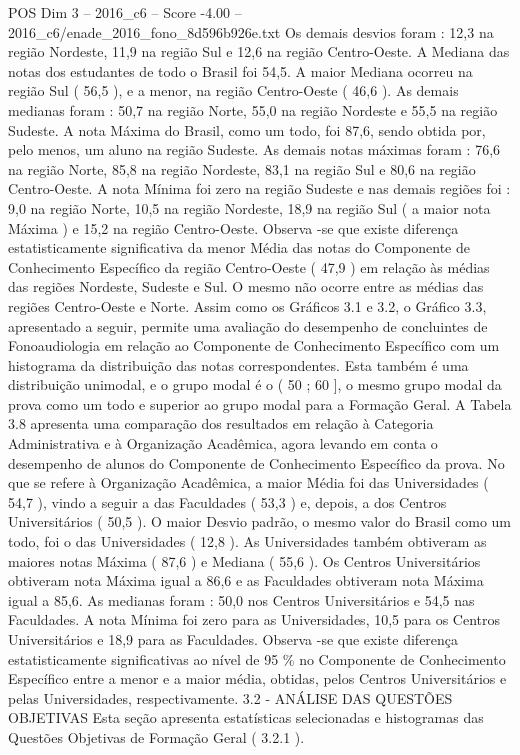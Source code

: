 \begin{textsample}{POS Dim 3 – 2016\_c6 – Score -4.00 – 2016\_c6/enade\_2016\_fono\_8d596b926e.txt}
Os demais desvios foram : 12,3 na região Nordeste, 11,9 na região Sul e 12,6 na região Centro-Oeste.
A Mediana das notas dos estudantes de todo o Brasil foi 54,5.
A maior Mediana ocorreu na região Sul ( 56,5 ), e a menor, na região Centro-Oeste ( 46,6 ).
As demais medianas foram : 50,7 na região Norte, 55,0 na região Nordeste e 55,5 na região Sudeste.
A nota Máxima do Brasil, como um todo, foi 87,6, sendo obtida por, pelo menos, um aluno na região Sudeste.
As demais notas máximas foram : 76,6 na região Norte, 85,8 na região Nordeste, 83,1 na região Sul e 80,6 na região Centro-Oeste.
A nota Mínima foi zero na região Sudeste e nas demais regiões foi : 9,0 na região Norte, 10,5 na região Nordeste, 18,9 na região Sul ( a maior nota Máxima ) e 15,2 na região Centro-Oeste.
Observa -se que existe diferença estatisticamente significativa da menor Média das notas do Componente de Conhecimento Específico da região Centro-Oeste ( 47,9 ) em relação às médias das regiões Nordeste, Sudeste e Sul.
O mesmo não ocorre entre as médias das regiões Centro-Oeste e Norte.
Assim como os Gráficos 3.1 e 3.2, o Gráfico 3.3, apresentado a seguir, permite uma avaliação do desempenho de concluintes de Fonoaudiologia em relação ao Componente de Conhecimento Específico com um histograma da distribuição das notas correspondentes.
Esta também é uma distribuição unimodal, e o grupo modal é o ( 50 ; 60 ], o mesmo grupo modal da prova como um todo e superior ao grupo modal para a Formação Geral.
A Tabela 3.8 apresenta uma comparação dos resultados em relação à Categoria Administrativa e à Organização Acadêmica, agora levando em conta o desempenho de alunos do Componente de Conhecimento Específico da prova.
No que se refere à Organização Acadêmica, a maior Média foi das Universidades ( 54,7 ), vindo a seguir a das Faculdades ( 53,3 ) e, depois, a dos Centros Universitários ( 50,5 ).
O maior Desvio padrão, o mesmo valor do Brasil como um todo, foi o das Universidades ( 12,8 ).
As Universidades também obtiveram as maiores notas Máxima ( 87,6 ) e Mediana ( 55,6 ).
Os Centros Universitários obtiveram nota Máxima igual a 86,6 e as Faculdades obtiveram nota Máxima igual a 85,6.
As medianas foram : 50,0 nos Centros Universitários e 54,5 nas Faculdades.
A nota Mínima foi zero para as Universidades, 10,5 para os Centros Universitários e 18,9 para as Faculdades.
Observa -se que existe diferença estatisticamente significativas ao nível de 95 \% no Componente de Conhecimento Específico entre a menor e a maior média, obtidas, pelos Centros Universitários e pelas Universidades, respectivamente. 3.2 - ANÁLISE DAS QUESTÕES OBJETIVAS Esta seção apresenta estatísticas selecionadas e histogramas das Questões Objetivas de Formação Geral ( 3.2.1 ).

\end{textsample}
